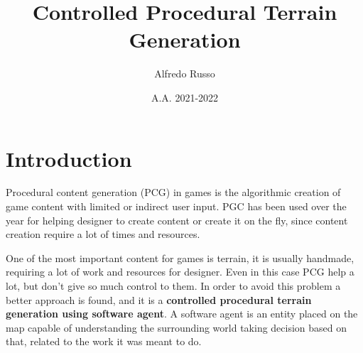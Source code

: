 \documentclass[12pt]{article}
\begin{document}
    \title{Controlled Procedural Terrain Generation}
    \author{Alfredo Russo}
    \date{A.A. 2021-2022}
    \maketitle
    \newpage
    
    \tableofcontents
    \newpage
    

    \section{Introduction}



    Procedural content generation (PCG) in games is the algorithmic creation of game content with limited or indirect user input. PGC has been used over the year 
    for helping designer to create content or create it on the fly, since content creation require a lot of times and resources.

    One of the most important content for games is terrain, it is usually handmade, requiring a lot of work and resources for designer. Even in this case PCG help
    a lot, but don't give so much control to them. In order to avoid this problem a better approach is found, and it is a \textbf{controlled procedural terrain generation
    using software agent}. A software agent is an entity placed on the map capable of understanding the surrounding world taking decision based on that, related to
    the work it was meant to do.
\end{document}
